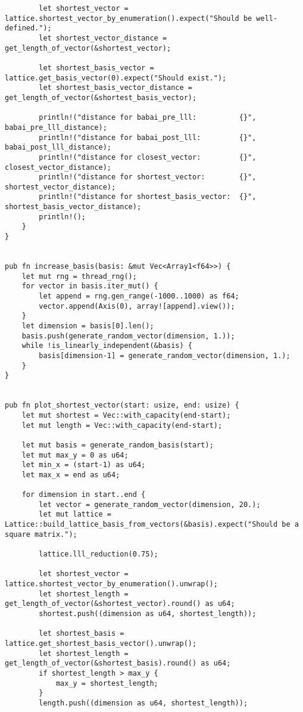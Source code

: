\begin{verbatim}
        let shortest_vector = lattice.shortest_vector_by_enumeration().expect("Should be well-defined.");
        let shortest_vector_distance = get_length_of_vector(&shortest_vector);

        let shortest_basis_vector = lattice.get_basis_vector(0).expect("Should exist.");
        let shortest_basis_vector_distance = get_length_of_vector(&shortest_basis_vector);

        println!("distance for babai_pre_lll:          {}", babai_pre_lll_distance);
        println!("distance for babai_post_lll:         {}", babai_post_lll_distance);
        println!("distance for closest_vector:         {}", closest_vector_distance);
        println!("distance for shortest_vector:        {}", shortest_vector_distance);
        println!("distance for shortest_basis_vector:  {}", shortest_basis_vector_distance);
        println!();
    }
}


pub fn increase_basis(basis: &mut Vec<Array1<f64>>) {
    let mut rng = thread_rng();
    for vector in basis.iter_mut() {
        let append = rng.gen_range(-1000..1000) as f64;
        vector.append(Axis(0), array![append].view());
    }
    let dimension = basis[0].len();
    basis.push(generate_random_vector(dimension, 1.));
    while !is_linearly_independent(&basis) {
        basis[dimension-1] = generate_random_vector(dimension, 1.);
    }
}


pub fn plot_shortest_vector(start: usize, end: usize) {
    let mut shortest = Vec::with_capacity(end-start);
    let mut length = Vec::with_capacity(end-start);

    let mut basis = generate_random_basis(start);
    let mut max_y = 0 as u64;
    let min_x = (start-1) as u64;
    let max_x = end as u64;

    for dimension in start..end {
        let vector = generate_random_vector(dimension, 20.);
        let mut lattice = Lattice::build_lattice_basis_from_vectors(&basis).expect("Should be a square matrix.");

        lattice.lll_reduction(0.75);

        let shortest_vector = lattice.shortest_vector_by_enumeration().unwrap();
        let shortest_length = get_length_of_vector(&shortest_vector).round() as u64;
        shortest.push((dimension as u64, shortest_length));

        let shortest_basis = lattice.get_shortest_basis_vector().unwrap();
        let shortest_length = get_length_of_vector(&shortest_basis).round() as u64;
        if shortest_length > max_y {
            max_y = shortest_length;
        }
        length.push((dimension as u64, shortest_length));


\end{verbatim}
